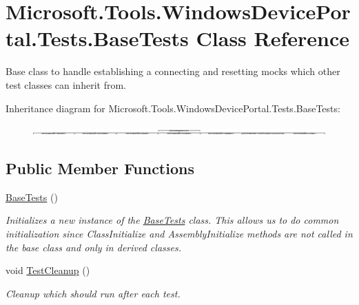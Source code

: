 \hypertarget{class_microsoft_1_1_tools_1_1_windows_device_portal_1_1_tests_1_1_base_tests}{}\section{Microsoft.\+Tools.\+Windows\+Device\+Portal.\+Tests.\+Base\+Tests Class Reference}
\label{class_microsoft_1_1_tools_1_1_windows_device_portal_1_1_tests_1_1_base_tests}


Base class to handle establishing a connecting and resetting mocks which other test classes can inherit from.  


Inheritance diagram for Microsoft.\+Tools.\+Windows\+Device\+Portal.\+Tests.\+Base\+Tests\+:\begin{figure}[H]
\begin{center}
\leavevmode
\includegraphics[height=0.242424cm]{class_microsoft_1_1_tools_1_1_windows_device_portal_1_1_tests_1_1_base_tests}
\end{center}
\end{figure}
\subsection*{Public Member Functions}
\begin{DoxyCompactItemize}
\item 
\hyperlink{class_microsoft_1_1_tools_1_1_windows_device_portal_1_1_tests_1_1_base_tests_aa6167ce015bf606a813731e4c10f0292}{Base\+Tests} ()
\begin{DoxyCompactList}\small\item\em Initializes a new instance of the \hyperlink{class_microsoft_1_1_tools_1_1_windows_device_portal_1_1_tests_1_1_base_tests}{Base\+Tests} class. This allows us to do common initialization since Class\+Initialize and Assembly\+Initialize methods are not called in the base class and only in derived classes. \end{DoxyCompactList}\item 
void \hyperlink{class_microsoft_1_1_tools_1_1_windows_device_portal_1_1_tests_1_1_base_tests_af3eb55363f33191094124c5330d68e89}{Test\+Cleanup} ()
\begin{DoxyCompactList}\small\item\em Cleanup which should run after each test. \end{DoxyCompactList}\end{DoxyCompactItemize}
